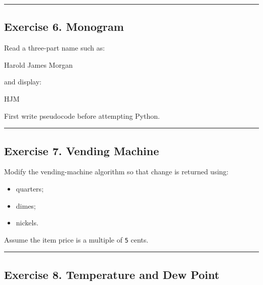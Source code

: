\documentclass[
]{article}
\newenvironment{Shaded}{\begin{snugshade}}{\end{snugshade}}
\newcommand{\NormalTok}[1]{#1}
\providecommand{\tightlist}{%
  \setlength{\itemsep}{0pt}\setlength{\parskip}{0pt}}
\begin{document}
\begin{center}\rule{0.5\linewidth}{0.5pt}\end{center}

\subsection{Exercise 6. Monogram}\label{exercise-6.-monogram}

Read a three-part name such as:

\begin{Shaded}
\begin{Highlighting}[]
\NormalTok{Harold James Morgan}
\end{Highlighting}
\end{Shaded}

and display:

\begin{Shaded}
\begin{Highlighting}[]
\NormalTok{HJM}
\end{Highlighting}
\end{Shaded}

First write pseudocode before attempting Python.

\begin{center}\rule{0.5\linewidth}{0.5pt}\end{center}

\subsection{Exercise 7. Vending
Machine}\label{exercise-7.-vending-machine}

Modify the vending-machine algorithm so that change is returned using:

\begin{itemize}
\tightlist
\item
  quarters;
\item
  dimes;
\item
  nickels.
\end{itemize}

Assume the item price is a multiple of \texttt{5} cents.

\begin{center}\rule{0.5\linewidth}{0.5pt}\end{center}

\subsection{Exercise 8. Temperature and Dew
Point}\label{exercise-8.-temperature-and-dew-point}
\end{document}
